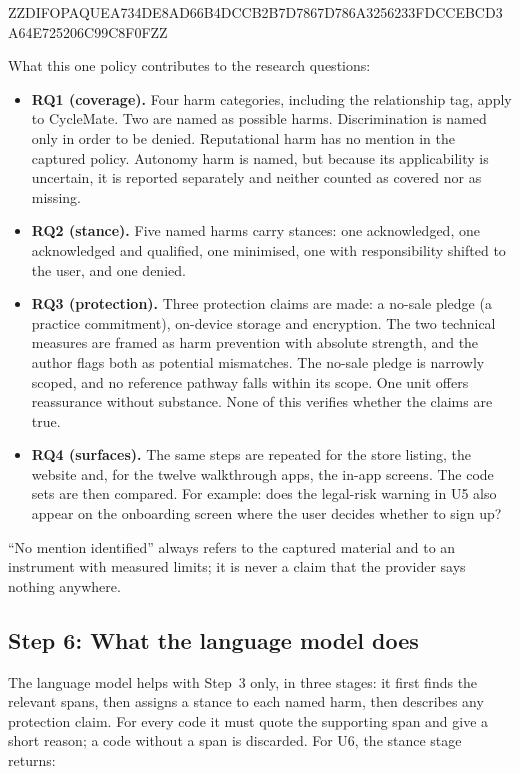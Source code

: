 \documentclass[twoside,its]{bossthesis}
\begin{document}
ZZDIFOPAQUEA734DE8AD66B4DCCB2B7D7867D786A3256233FDCCEBCD3A64E725206C99C8F0FZZ



\noindent What this one policy contributes to the research questions:
\begin{itemize}
  \item \textbf{RQ1 (coverage).} Four harm categories, including the
    relationship tag, apply to CycleMate. Two are named as possible harms.
    Discrimination is named only in order to be denied. Reputational harm has
    no mention in the captured policy. Autonomy harm is named, but because its
    applicability is uncertain, it is reported separately and neither counted
    as covered nor as missing.
  \item \textbf{RQ2 (stance).} Five named harms carry stances: one
    acknowledged, one acknowledged and qualified, one minimised, one with
    responsibility shifted to the user, and one denied.
  \item \textbf{RQ3 (protection).} Three protection claims are made: a
    no-sale pledge (a practice commitment), on-device storage and encryption.
    The two technical measures are framed as harm prevention with absolute
    strength, and the author flags both as potential mismatches. The no-sale
    pledge is narrowly scoped, and no reference pathway falls within its
    scope. One unit offers reassurance without substance. None of this
    verifies whether the claims are true.
  \item \textbf{RQ4 (surfaces).} The same steps are repeated for the store
    listing, the website and, for the twelve walkthrough apps, the in-app
    screens. The code sets are then compared. For example: does the legal-risk
    warning in U5 also appear on the onboarding screen where the user decides
    whether to sign up?
\end{itemize}
\enquote{No mention identified} always refers to the captured material and to
an instrument with measured limits; it is never a claim that the provider
says nothing anywhere.

\subsection*{Step 6: What the language model does}

The language model helps with Step~3 only, in three stages: it first finds
the relevant spans, then assigns a stance to each named harm, then describes
any protection claim. For every code it must quote the supporting span and
give a short reason; a code without a span is discarded. For U6, the stance
stage returns:
\end{document}

